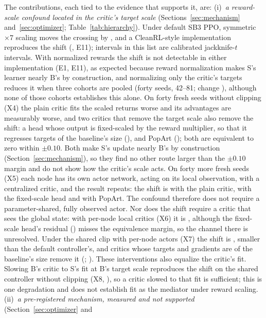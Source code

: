 The contributions, each tied to the evidence that supports it, are:
(i)~\emph{a reward-scale confound located in the critic's target scale} (Sections~\ref{sec:mechanism}
and~\ref{sec:optimizer}; Table~\ref{tab:hierarchy}). Under default SB3 PPO, symmetric $\times7$ scaling moves the
crossing by \VjtPStd{}, and a CleanRL-style implementation reproduces the shift (\VjtPElevenRaw{}, E11); intervals in
this list are calibrated jackknife-$t$ intervals. With normalized rewards the shift is not detectable in either
implementation (E1, E11), as expected because reward normalization makes S's learner nearly B's by construction, and normalizing only the critic's targets reduces it when three cohorts are pooled (forty
seeds, 42--81; change \VjtChPool{}), although none of those cohorts establishes this alone. On forty fresh seeds
without clipping (X4) the plain critic fits the scaled returns worse and its advantages are measurably worse, and two
critics that remove the target scale also remove the shift: a head whose output is fixed-scaled by the reward
multiplier, so that it regresses targets of the baseline's size (\VxfHead{}), and PopArt (\VxfPop{}); both are
equivalent to zero within $\pm0.10$. Both make S's update nearly B's by construction (Section~\ref{sec:mechanism}), so
they find no other route larger than the $\pm0.10$ margin and do not show how the critic's scale acts. On forty more fresh seeds (X5) each node has its own actor network, acting on its
local observation, with a centralized critic, and the result repeats: the shift is \VxvPlain{} with the plain critic,
\VxvHead{} with the fixed-scale head and \VxvPop{} with PopArt. The confound therefore does not require a
parameter-shared, fully observed actor. Nor does the shift require a critic that sees the global state: with per-node
local critics (X6) it is \VxsixPlain{}, although the fixed-scale head's residual (\VxsixHead{}) misses the equivalence
margin, so the channel there is unresolved. Under the shared clip with per-node actors (X7) the shift is \VxsevPlain{},
smaller than the default controller's, and critics whose targets and gradients are of the baseline's size remove it
(\VxsevHead{}; \VxsevPop{}). These interventions also equalize the critic's fit. Slowing B's critic to S's fit at B's
target scale reproduces the shift on the shared controller without clipping (X8, \VxeiDeg{}), so a critic slowed to
that fit is sufficient; this is one degradation and does not establish fit as the mediator under reward scaling.
(ii)~\emph{a pre-registered mechanism, measured and not supported} (Section~\ref{sec:optimizer} and
